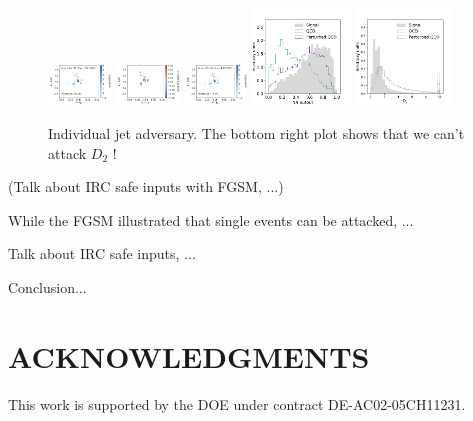 \documentclass[reprint,nofootinbib,...]{revtex4-1}
\begin{document}
\begin{figure}[h!]
\centering
\includegraphics[width=0.15\textwidth]{figures/panel_1.pdf}
\includegraphics[width=0.15\textwidth]{figures/panel_3.pdf}
\includegraphics[width=0.15\textwidth]{figures/panel_2.pdf}
\includegraphics[width=0.23\textwidth]{figures/NN_FGSM.pdf}
\includegraphics[width=0.23\textwidth]{figures/D2_FGSM.pdf}
\label{fig:FGSM}
\caption{Individual jet adversary.  The bottom right plot shows that we can't attack $D_2$ !}
\end{figure}

(Talk about IRC safe inputs with FGSM, ...)

While the FGSM illustrated that single events can be attacked, ...

Talk about IRC safe inputs, ...

Conclusion...


\section*{ACKNOWLEDGMENTS}

This work is supported by the DOE under contract DE-AC02-05CH11231. 


\end{document}

